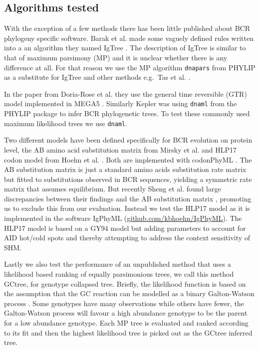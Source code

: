 \subsection{Algorithms tested}
With the exception of a few methods there has been little published about BCR phylogeny specific software.
Barak et al. made some vaguely defined rules written into a an algorithm they named IgTree \cite{Barak2008-fw}.
The description of IgTree is similar to that of maximum parsimony (MP) and it is unclear whether there is any difference at all.
For that reason we use the MP algorithm \texttt{dnapars} from PHYLIP \cite{plotree1989phylip} as a substitute for IgTree and other methods e.g.\ Tas et al. \cite{tas2016visualizing}.

In the paper from Doria-Rose et al. \cite{Doria-Rose2014-vi} they use the general time reversible (GTR) model implemented in MEGA5 \cite{tamura2011mega5}.
Similarly Kepler \cite{Kepler2013-sy} was using \texttt{dnaml} from the PHYLIP package to infer BCR phylogenetic trees.
To test these commonly used maximum likelihood trees we use \texttt{dnaml}.

Two different models have been defined specifically for BCR evolution on protein level, the AB amino acid substitution matrix from Mirsky et al. \cite{mirsky2014antibody} and HLP17 codon model from Hoehn et al. \cite{Hoehn2016-wg}.
Both are implemented with codonPhyML \cite{gil2013codonphyml}.
The AB substitution matrix is just a standard amino acids substitution rate matrix but fitted to substitutions observed in BCR sequences, yielding a symmetric rate matrix that assumes equilibrium.
But recently Sheng et al. found large discrepancies between their findings and the AB substitution matrix \cite{sheng2017gene}, promoting us to exclude this from our evaluation.
Instead we test the HLP17 model as it is implemented in the software IgPhyML (\url{github.com/kbhoehn/IgPhyML}).
The HLP17 model is based on a GY94 model \cite{goldman1994codon} but adding parameters to account for AID hot/cold spots and thereby attempting to address the context sensitivity of SHM.

Lastly we also test the performance of an unpublished method that uses a likelihood based ranking of equally parsimonious trees, we call this method GCtree, for genotype collapsed tree.
Briefly, the likelihood function is based on the assumption that the GC reaction can be modelled as a binary Galton-Watson process \cite{harris2002theory}.
Some genotypes have many observations while others have fewer, the Galton-Watson process will favour a high abundance genotype to be the parent for a low abundance genotype.
Each MP tree is evaluated and ranked according to its fit and then the highest likelihood tree is picked out as the GCtree inferred tree.



